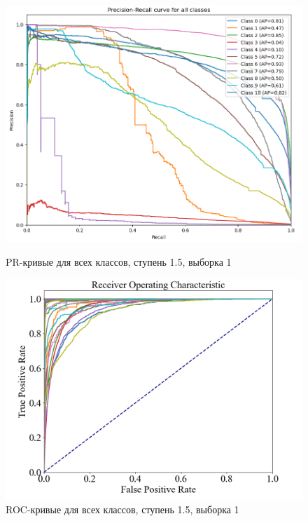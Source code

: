 \documentclass{article}
\begin{document}
\begin{figure}[!ht]
    \begin{minipage}[b]{0.48\textwidth}
        \centering
        \includegraphics[width=\linewidth]{pr_with_bad.png}
        \caption{PR-кривые для всех классов, ступень 1.5, выборка 1}
        \label{fig:pr1}
    \end{minipage}
    \hfill
    \begin{minipage}[b]{0.54\textwidth}
        \centering
        \includegraphics[width=\linewidth]{roc_with_bad.png}
        \caption{ROC-кривые для всех классов, ступень 1.5, выборка 1}
        \label{fig:roc1}
    \end{minipage}
\end{figure}
\end{document}
